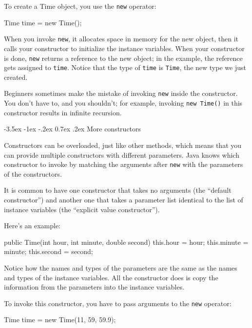 \documentclass[12pt]{book}
\makeatletter
\theoremstyle{exercise}
\newcommand{\java}[1]{\verb"#1"}
\renewcommand{\section}{\@startsection{section}{1}{\z@}%
    {-3.5ex \@plus -1ex \@minus -.2ex}%
    {0.7ex \@plus.2ex}%
    {\normalfont\Large\bfseries}}
\newcommand{\java}[1]{\lstinline{#1}} %
\makeatother
\begin{document}
To create a Time object, you use the \java{new} operator:

\begin{code}
    Time time = new Time();
\end{code}

When you invoke \java{new}, it allocates space in memory for the new object, then it calls your constructor to initialize the instance variables.
When your constructor is done, \java{new} returns a reference to the new object; in the example, the reference gets assigned to \java{time}.
Notice that the type of \java{time} is \java{Time}, the new type we just created.

Beginners sometimes make the mistake of invoking \java{new} inside the constructor.
You don't have to, and you shouldn't; for example, invoking \java{new Time()} in this constructor results in infinite recursion.


\section{More constructors}


Constructors can be overloaded, just like other methods, which means that you can provide multiple constructors with different parameters.
Java knows which constructor to invoke by matching the arguments after \java{new} with the parameters of the constructors.

It is common to have one constructor that takes no arguments (the ``default constructor'') and another one that takes a parameter list identical to the list of instance variables (the ``explicit value constructor'').

Here's an example:

\begin{code}
    public Time(int hour, int minute, double second) {
        this.hour = hour;
        this.minute = minute;
        this.second = second;
    }
\end{code}

Notice how the names and types of the parameters are the same as the names and types of the instance variables.
All the constructor does is copy the information from the parameters into the instance variables.

To invoke this constructor, you have to pass arguments to the \java{new} operator:

\begin{code}
    Time time = new Time(11, 59, 59.9);
\end{code}
\end{document}
